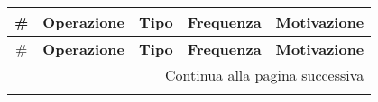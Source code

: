 \setlength\extrarowheight{2pt}
\small
\begin{longtable}{|c|p{3cm}|c|c|p{4.18cm}|}
    \hline \# & \textbf{Operazione}                                                                         & \textbf{Tipo} & \textbf{Frequenza} & \textbf{Motivazione}                                                                                                                                     \\\hline
    \endfirsthead

    \hline \# & \textbf{Operazione}                                                                         & \textbf{Tipo} & \textbf{Frequenza} & \textbf{Motivazione}                                                                                                                                     \\\hline
    \endhead

    \hline \multicolumn{5}{|r|}{{Continua alla pagina successiva}}                                                                                                                                                                                                                                          \\\hline
    \endfoot


\end{longtable}
